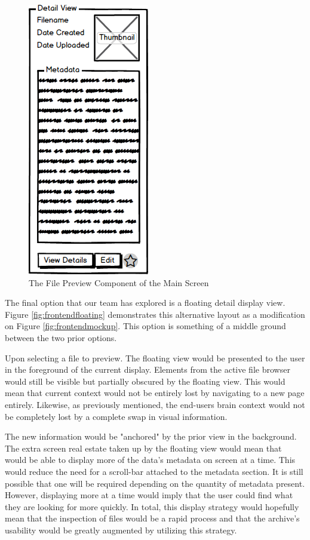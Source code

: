 \documentclass[12pt]{report}
\begin{document}
\begin{figure}[h]
	\centering
	\includegraphics[scale=0.5]{frontend_file_preview}
	\caption{The File Preview Component of the Main Screen}
	\label{fig:frontendfilepreview}
\end{figure}

The final option that our team has explored is a floating detail display view. Figure \ref{fig:frontendfloating} demonstrates this alternative layout as a modification on Figure \ref{fig:frontendmockup}. This option is something of a middle ground between the two prior options.

Upon selecting a file to preview. The floating view would be presented to the user in the foreground of the current display. Elements from the active file browser would still be visible but partially obscured by the floating view. This would mean that current context would not be entirely lost by navigating to a new page entirely. Likewise, as previously mentioned, the end-users brain context would not be completely lost by a complete swap in visual information.

The new information would be "anchored" by the prior view in the background. The extra screen real estate taken up by the floating view would mean that would be able to display more of the data's metadata on screen at a time. This would reduce the need for a scroll-bar attached to the metadata section. It is still possible that one will be required depending on the quantity of metadata present. However, displaying more at a time would imply that the user could find what they are looking for more quickly. In total, this display strategy would hopefully mean that the inspection of files would be a rapid process and that the archive's usability would be greatly augmented by utilizing this strategy.
\end{document}
